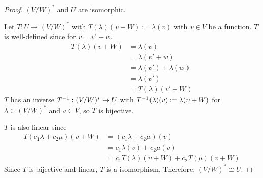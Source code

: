 \begin{proof}$(V/W)^*$ and $U$ are isomorphic.\gap

    Let $T: U \rightarrow (V/W)^*$ with $T(\lambda)(v+W) := \lambda(v)$ 
    with $v \in V$ be a function.
    $T$ is well-defined since for $v = v' + w$.
    \begin{align*}
        T(\lambda)(v+W)
        &= \lambda(v)\\
        &= \lambda(v' + w)\\
        &= \lambda(v') + \lambda(w)\\
        &= \lambda(v')\\
        &= T(\lambda)(v'+W)
    \end{align*}
    $T$ has an inverse $T^{-1}: (V/W)^* \rightarrow U$ with
    $T^{-1}(\lambda)(v) := \lambda(v+W)$ for $\lambda \in (V/W)^*$ and $v \in V$,
    so $T$ is bijective.\gap

    $T$ is also linear since
    \begin{align*}
        T(c_1\lambda + c_2\mu)(v+W)
        &= (c_1\lambda + c_2\mu)(v)\\
        &= c_1\lambda(v) + c_2\mu(v)\\
        &= c_1T(\lambda)(v+W) + c_2T(\mu)(v+W)
    \end{align*}
    Since $T$ is bijective and linear, $T$ is a isomorphism.
    Therefore, $(V/W)^* \cong U$.
\end{proof}